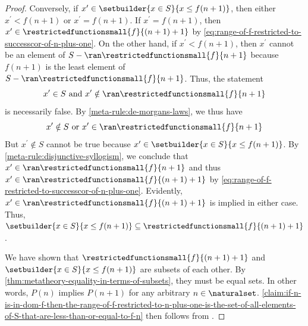 \begin{proof}
    \vspace{0.3cm}
    \noindent
    Conversely, if \( x^{\prime} \in \setbuilder{x \in S}{x \leq f(n + 1)} \), then either \( x^{\prime} < f(n + 1) \) or \( x^{\prime} = f(n + 1) \).
    If \( x^{\prime} = f(n + 1) \), then \( x^{\prime} \in \restrictedfunctionsmall{f}{\mleft( n + 1 \mright) + 1} \)
    by \eqref{eq:range-of-f-restricted-to-successcor-of-n-plus-one}.
    On the other hand, if \( x^{\prime} < f(n + 1) \), then \( x^{\prime} \) cannot be an element of \( S - \ran \restrictedfunctionsmall{f}{n + 1} \)
    because \( f(n + 1) \) is the least element of \( S - \ran \restrictedfunctionsmall{f}{n + 1} \).
    Thus, the statement
    \begin{equation*}
        x^{\prime} \in S \ \text{and} \ x^{\prime} \notin \ran \restrictedfunctionsmall{f}{n + 1}
    \end{equation*}
    is necessarily false. By \cref{meta-rule:de-morgans-laws}, we thus have
    \begin{equation*}
        x^{\prime} \notin S \ \text{or} \ x^{\prime} \in \ran \restrictedfunctionsmall{f}{n + 1}
    \end{equation*}
    But \( x^{\prime} \notin S \) cannot be true because \( x^{\prime} \in \setbuilder{x \in S}{x \leq f(n + 1)} \).
    By \cref{meta-rule:disjunctive-syllogism}, we conclude that \( x^{\prime} \in \ran \restrictedfunctionsmall{f}{n + 1} \) and thus
    \( x^{\prime} \in \ran \restrictedfunctionsmall{f}{\mleft( n + 1 \mright) + 1} \) by \eqref{eq:range-of-f-restricted-to-successcor-of-n-plus-one}.
    Evidently, \( x^{\prime} \in \ran \restrictedfunctionsmall{f}{\mleft( n + 1 \mright) + 1} \) is implied in either case.
    Thus, \( \setbuilder{x \in S}{x \leq f(n + 1)} \subseteq \restrictedfunctionsmall{f}{\mleft( n + 1 \mright) + 1} \).

    \vspace{0.3cm}
    \noindent
    We have shown that \( \restrictedfunctionsmall{f}{\mleft( n + 1 \mright) + 1} \) and \( \setbuilder{x \in S}{x \leq f(n + 1)} \)
    are subsets of each other. By \cref{thm:metatheory-equality-in-terms-of-subsets}, they must be equal sets.
    In other words, \( P(n) \) implies \( P(n + 1) \) for any arbitrary \( n \in \naturalset \).
    \cref{claim:if-n-is-in-dom-f-then-the-range-of-f-restricted-to-n-plus-one-is-the-set-of-all-elements-of-S-that-are-less-than-or-equal-to-f-n} then follows
    from .


\end{proof}
